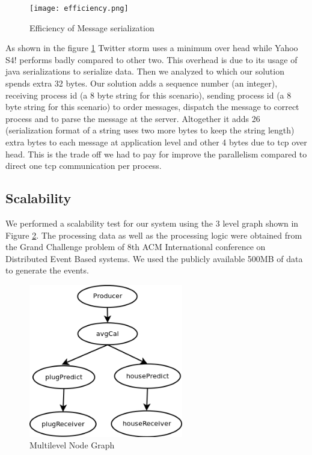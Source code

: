\begin{figure}
        \centering
        \texttt{[image: efficiency.png]}
        \caption{Efficiency of Message serialization}
        \label{efficiency}
\end{figure}

As shown in the figure \ref{efficiency} Twitter storm uses a minimum over head while Yahoo S4! performs badly compared to other two. This overhead is due to its usage of  java serializations to serialize data. Then we analyzed to which our solution spends extra 32 bytes. Our solution adds a sequence number (an integer), receiving process id (a 8 byte string for this scenario), sending process id (a 8 byte string for this scenario) to order messages, dispatch the message to correct process and to parse the message at the server. Altogether it adds 26 (serialization format of a string uses two more bytes to keep the string length) extra bytes to each message at application level and other 4 bytes due to tcp over head. This is the trade off we had to pay for improve the parallelism compared to direct one tcp communication per process. 

\subsection{Scalability}
We performed a scalability test for our system using the 3 level graph shown in Figure \ref{multigraph}. The processing data as well as the processing logic were obtained from the Grand Challenge problem of 8th ACM International conference on Distributed Event Based systems. We used the publicly available 500MB of data to generate the events. 

\begin{figure}
        \centering
        \includegraphics[width=0.6\textwidth]{multigraph.png}
        \caption{Multilevel Node Graph}
        \label{multigraph}
\end{figure}

